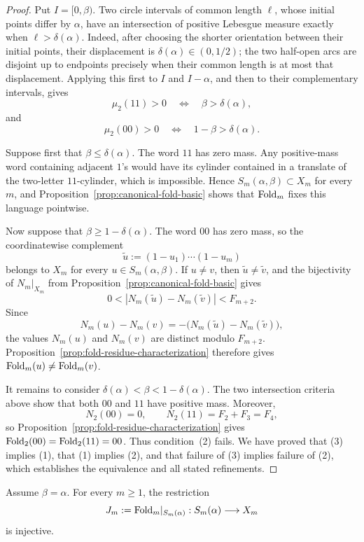 \begin{proof}
Put \(I=[0,\beta)\).  Two circle intervals of common length \(\ell\), whose
initial points differ by \(\alpha\), have an intersection of positive
Lebesgue measure exactly when \(\ell>\delta(\alpha)\).  Indeed, after choosing
the shorter orientation between their initial points, their displacement is
\(\delta(\alpha)\in(0,1/2)\); the two half-open arcs are disjoint up to
endpoints precisely when their common length is at most that displacement.
Applying this first to \(I\) and \(I-\alpha\), and then to their complementary
intervals, gives
\[
\mu_2(11)>0\quad\Longleftrightarrow\quad
\beta>\delta(\alpha),
\]
and
\[
\mu_2(00)>0\quad\Longleftrightarrow\quad
1-\beta>\delta(\alpha).
\]

Suppose first that \(\beta\le\delta(\alpha)\).  The word \(11\) has zero
mass.  Any positive-mass word containing adjacent \(1\)'s would have its
cylinder contained in a translate of the two-letter \(11\)-cylinder, which
is impossible.  Hence \(S_m(\alpha,\beta)\subset X_m\) for every \(m\), and
Proposition~\ref{prop:canonical-fold-basic} shows that \(\mathrm{Fold}_m\) fixes this
language pointwise.

Now suppose that \(\beta\ge1-\delta(\alpha)\).  The word \(00\) has zero
mass, so the coordinatewise complement
\[
\widetilde u:=(1-u_1)\cdots(1-u_m)
\]
belongs to \(X_m\) for every \(u\in S_m(\alpha,\beta)\).  If \(u\ne v\),
then \(\widetilde u\ne\widetilde v\), and the bijectivity of
\(N_m|_{X_m}\) from Proposition~\ref{prop:canonical-fold-basic} gives
\[
0<\left|N_m(\widetilde u)-N_m(\widetilde v)\right|<F_{m+2}.
\]
Since
\[
N_m(u)-N_m(v)
=-\bigl(N_m(\widetilde u)-N_m(\widetilde v)\bigr),
\]
the values \(N_m(u)\) and \(N_m(v)\) are distinct modulo \(F_{m+2}\).
Proposition~\ref{prop:fold-residue-characterization} therefore gives
\(\mathrm{Fold}_m(u)\ne\mathrm{Fold}_m(v)\).

It remains to consider
\(\delta(\alpha)<\beta<1-\delta(\alpha)\).  The two intersection criteria
above show that both \(00\) and \(11\) have positive mass.  Moreover,
\[
N_2(00)=0,
\qquad
N_2(11)=F_2+F_3=F_4,
\]
so Proposition~\ref{prop:fold-residue-characterization} gives
\(\mathrm{Fold}_2(00)=\mathrm{Fold}_2(11)=00\).  Thus condition~(2) fails.  We have proved
that (3) implies (1), that (1) implies (2), and that failure of (3) implies
failure of (2), which establishes the equivalence and all stated refinements.
\end{proof}

\begin{corollary}
\label{thm:sturmian-no-collision-rigidity}
Assume \(\beta=\alpha\). For every \(m\ge1\), the restriction
\[
J_m:=\mathrm{Fold}_m|_{S_m(\alpha)}:S_m(\alpha)\longrightarrow X_m
\]
is injective.
\end{corollary}

